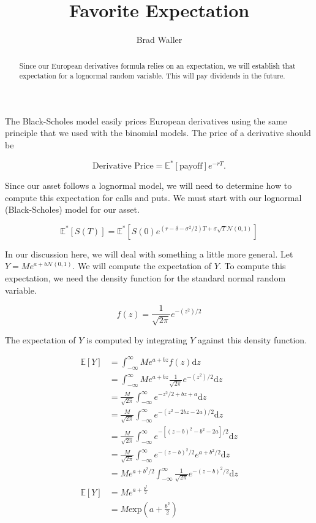 \documentclass{ximera}
\author{Brad Waller}
\title{Favorite Expectation}
\begin{document}
\begin{abstract}
Since our European derivatives formula relies on an expectation, we will establish that expectation for a lognormal random variable. This will pay dividends in the future.
\end{abstract}

\maketitle

The Black-Scholes model easily prices European derivatives using the same principle that we used with the binomial models. The price of a derivative should be 

\begin{equation*}
\text{Derivative Price}=\mathbb{E}^*[\text{payoff}]e^{-rT}.
\end{equation*}

Since our asset follows a lognormal model, we will need to determine how to compute this expectation for calls and puts. We must start with our lognormal (Black-Scholes) model for our asset.

\begin{equation*}
\mathbb{E}^*[S(T)]=\mathbb{E}^*[S(0)e^{(r-\delta-\sigma^2/2)T+\sigma\sqrt{T}\mathcal{N}(0,1)}]
\end{equation*}

In our discussion here, we will deal with something a little more general. Let $Y=Me^{a+b\mathcal{N}(0,1)}$. We will compute the expectation of $Y$. To compute this expectation, we need the density function for the standard normal random variable.

\begin{equation*}
f(z)=\frac{1}{\sqrt{2\pi}}e^{-(z^2)/2}
\end{equation*}

The expectation of $Y$ is computed by integrating $Y$ against this density function.

\begin{align*}
\mathbb{E}[Y] 	&=\int_{-\infty}^{\infty}Me^{a+bz}f(z)\mathrm{d}z\\
			&=\int_{-\infty}^{\infty}Me^{a+bz}\frac{1}{\sqrt{2\pi}}e^{-(z^2)/2}\mathrm{d}z\\
			&=\frac{M}{\sqrt{2\pi}}\int_{-\infty}^{\infty}e^{-z^2/2+bz+a}\mathrm{d}z\\
			&=\frac{M}{\sqrt{2\pi}}\int_{-\infty}^{\infty}e^{-(z^2-2bz-2a)/2}\mathrm{d}z\\
			&=\frac{M}{\sqrt{2\pi}}\int_{-\infty}^{\infty}e^{-[(z-b)^2-b^2-2a]/2}\mathrm{d}z\\
			&=\frac{M}{\sqrt{2\pi}}\int_{-\infty}^{\infty}e^{-(z-b)^2/2}e^{a+b^2/2}\mathrm{d}z\\
			&=Me^{a+b^2/2}\int_{-\infty}^{\infty}\frac{1}{\sqrt{2\pi}}e^{-(z-b)^2/2}\mathrm{d}z\\
\mathbb{E}[Y] 	&=Me^{a+\frac{b^2}{2}}\\
			&=M\text{exp}\left(a+\frac{b^2}{2}\right)
\end{align*}
\end{document}
